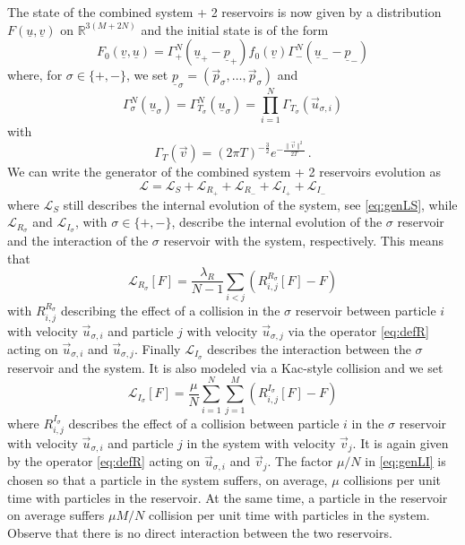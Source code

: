\documentclass{article}
\newcommand \ul[1]{\underline{#1}}
\renewcommand\v[1]{\vec{#1}}
\newcommand*\R{ \mathds{R} }
\newcommand\uv{{\underline v}}
\newcommand\uu{{\underline u}}
\newcommand\vv{{\vec v}}
\newcommand\vu{{\vec u}}
\begin{document}
The state of the combined
system + 2 reservoirs is now given by a distribution $F(\uu,\uv)$ on $\R^{3(M+2N)}$ and the initial state is of
the form %
\begin{equation}\label{eq:ini2}
F_0(\uv,\uu)=\Gamma^N_+(\uu_+-\underline p_+)f_0(\uv)\Gamma^N_-(\uu_--\underline p_-)
\end{equation}
%
where, for $\sigma\in\{+,-\}$, we set $\ul p_\sigma=(\vec p_\sigma,\ldots, \vec p_\sigma)$ and
%
\begin{equation*}
\Gamma^N_\sigma(\uu_\sigma)=\Gamma_{T_\sigma}^{N}(\uu_\sigma)=\prod_{i=1}^{N} \Gamma_{T_\sigma}(\vu_{\sigma,i})
\end{equation*}
%
with
%
\begin{equation*}
\Gamma_{T}(\vv)=\left(2\pi T\right)^{-\frac32}e^{-\frac {\|\vv\|^2}{2T}}\, .
\end{equation*}
%
We can write the generator of the combined system + 2 reservoirs evolution as
%
\begin{equation}\label{eq:gen2res}
\mathcal L=\mathcal L_S+\mathcal L_{R_+}+\mathcal L_{R_-}+\mathcal L_{I_+}+\mathcal L_{I_-}
\end{equation}
%
where $\mathcal L_S$ still describes the internal evolution of the system, see \eqref{eq:genLS}, while $\mathcal
L_{R_\sigma}$ and $\mathcal L_{I_\sigma}$, with $\sigma\in\{+,-\}$, describe the internal evolution of the $\sigma$ reservoir and
the interaction of the $\sigma$ reservoir with the system, respectively. This means that
%
\begin{equation*}
\mathcal L_{R_\sigma}[F]=\frac{\lambda_{R}}{N-1}\sum_{i<j} (R_{i,j}^{R_\sigma}[F]-F)
\end{equation*}
%
with $R_{i,j}^{R_\sigma}$ describing the effect of a collision in the $\sigma$ reservoir between particle $i$ with 
velocity $\v
u_{\sigma,i}$ and particle $j$ with velocity $\v u_{\sigma,j}$ via the operator \eqref{eq:defR} acting on $\v
u_{\sigma,i}$ and $\v u_{\sigma,j}$. Finally $\mathcal L_{I_\sigma}$ describes the interaction between
the $\sigma$ reservoir and the system. It is also modeled via a Kac-style collision and we set
%
\begin{equation}\label{eq:genLI}
\mathcal L_{I_\sigma}[F]=\frac \mu N\sum_{i=1}^N\sum_{j=1}^M (R_{i,j}^{I_\sigma}[F]-F)
\end{equation}
%
where $R_{i,j}^{I_\sigma}$ describes the effect of a collision between particle $i$ in the $\sigma$ reservoir with 
velocity $\v
u_{\sigma,i}$ and particle $j$ in the system with velocity $\v v_j$. It is again given by the operator \eqref{eq:defR}
acting on $\v u_{\sigma,i}$ and $\vec v_j$. The factor $\mu/N$ in \eqref{eq:genLI} is chosen so that a particle in the
system suffers, on average, $\mu$ collisions per unit time with particles in the reservoir. At the same time, a particle
in the reservoir on average suffers $\mu M/N$ collision per unit time with particles in the system. Observe that there
is no direct interaction between the two reservoirs. 
\end{document}

